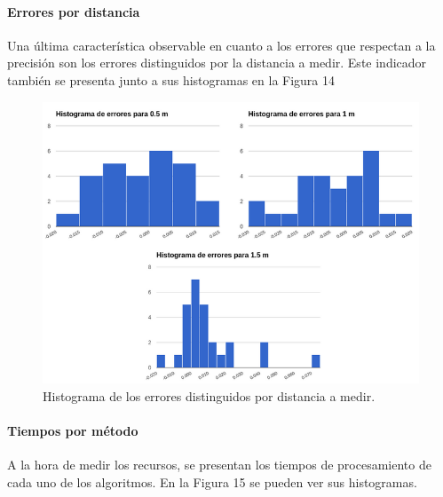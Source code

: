 \documentclass[11pt,a4paper,titlepage]{article}
\newcommand{\Figure}[1]{Figura #1}
\begin{document}
\paragraph{Errores por distancia}
\hfill \break

Una última característica observable en cuanto a los errores que respectan a la precisión son los errores distinguidos por la distancia a medir. Este indicador también se presenta junto a sus histogramas en la \Figure{14}


\begin{figure}[h!]

  \centering
    \includegraphics[width=1\textwidth]{f14.png}
  \caption{Histograma de los errores distinguidos por distancia a medir.}
\end{figure}

\paragraph{Tiempos por método}
\hfill \break

A la hora de medir los recursos, se presentan los tiempos de procesamiento de cada uno de los algoritmos. En la \Figure{15} se pueden ver sus histogramas.

\end{document}
